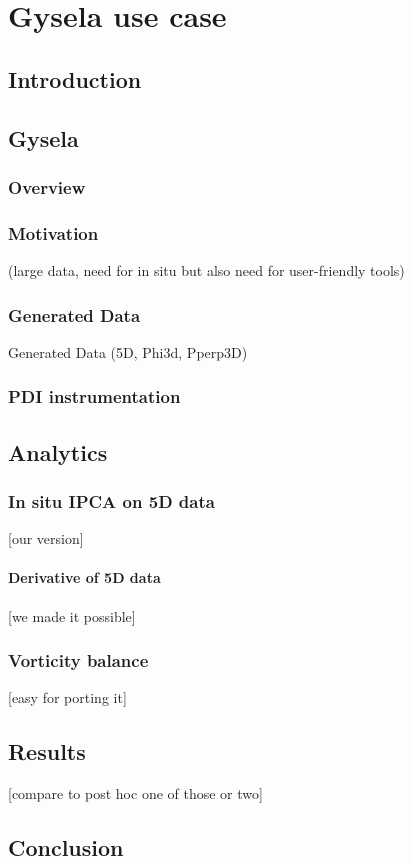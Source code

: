 \chapter{Gysela use case}
\section{Introduction}
\section{Gysela}
\subsection{Overview}
\subsection{Motivation}
 (large data, need for in situ but also need for user-friendly tools)
\subsection{Generated Data}
Generated Data (5D, Phi3d, Pperp3D)

\subsection{PDI instrumentation}

\section{Analytics}
\subsection{In situ IPCA on 5D data 
}
[our version]
\subsubsection{Derivative of 5D data}
 [we made it possible]
\subsection{Vorticity balance}
[easy for porting it]

\section{Results}
[compare to post hoc one of those or two]

\section{Conclusion}